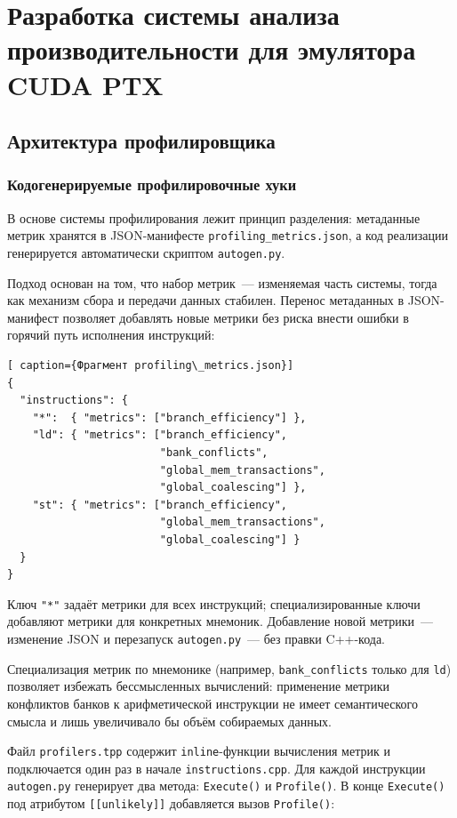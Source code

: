 \section{Разработка системы анализа производительности для эмулятора CUDA PTX}

\subsection{Архитектура профилировщика}

\subsubsection{Кодогенерируемые профилировочные хуки}

В основе системы профилирования лежит принцип разделения: метаданные метрик хранятся в JSON-манифесте
\texttt{profiling\_metrics.json}, а код реализации генерируется автоматически скриптом \texttt{autogen.py}.

Подход основан на том, что набор метрик~--- изменяемая
часть системы, тогда как механизм сбора и передачи данных стабилен.
Перенос метаданных в JSON-манифест позволяет добавлять новые метрики
без риска внести ошибки в горячий путь исполнения инструкций:

\begin{lstlisting}[ caption={Фрагмент profiling\_metrics.json}]
{
  "instructions": {
    "*":  { "metrics": ["branch_efficiency"] },
    "ld": { "metrics": ["branch_efficiency",
                        "bank_conflicts",
                        "global_mem_transactions",
                        "global_coalescing"] },
    "st": { "metrics": ["branch_efficiency",
                        "global_mem_transactions",
                        "global_coalescing"] }
  }
}
\end{lstlisting}

Ключ \texttt{"*"} задаёт метрики для всех инструкций;
специализированные ключи добавляют метрики для конкретных мнемоник.
Добавление новой метрики~--- изменение JSON и перезапуск
\texttt{autogen.py}~--- без правки C++-кода.

Специализация метрик по мнемонике (например, \texttt{bank\_conflicts}
только для \texttt{ld}) позволяет избежать бессмысленных вычислений:
применение метрики конфликтов банков к арифметической инструкции
не имеет семантического смысла и лишь увеличивало бы объём собираемых данных.

Файл \texttt{profilers.tpp} содержит \texttt{inline}-функции
вычисления метрик и подключается один раз в начале
\texttt{instructions.cpp}. Для каждой инструкции \texttt{autogen.py}
генерирует два метода: \texttt{Execute()} и \texttt{Profile()}.
В конце \texttt{Execute()} под атрибутом \texttt{[[unlikely]]}
добавляется вызов \texttt{Profile()}:

